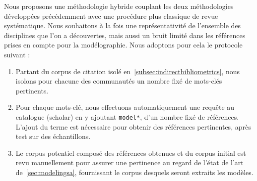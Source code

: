 Nous proposons une méthodologie hybride couplant les deux méthodologies développées précédemment avec une procédure plus classique de revue systématique. Nous souhaitons à la fois une représentativité de l'ensemble des disciplines que l'on a découvertes, mais aussi un bruit limité dans les références prises en compte pour la modélographie. Nous adoptons pour cela le protocole suivant :

%
%  
%
% 
%


\begin{enumerate}
\item Partant du corpus de citation isolé en~\ref{subsec:indirectbibliometrics}, nous isolons pour chacune des communautés un nombre fixé de mots-clés pertinents.
\item Pour chaque mots-clé, nous effectuons automatiquement une requête au catalogue (scholar) en y ajoutant \texttt{model*}, d'un nombre fixé de références. L'ajout du terme est nécessaire pour obtenir des références pertinentes, après test sur des échantillons.
\item Le corpus potentiel composé des références obtenues et du corpus initial est revu manuellement pour assurer une pertinence au regard de l'état de l'art de~\ref{sec:modelingsa}, fournissant le corpus desquels seront extraits les modèles.
\end{enumerate}

